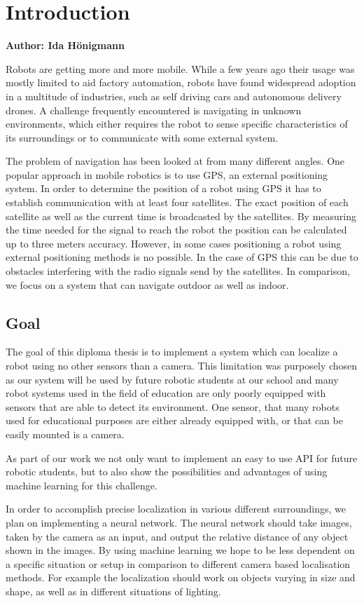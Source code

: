 \chapter{Introduction}

\textbf{Author: Ida Hönigmann}

\vspace{2mm}

Robots are getting more and more mobile. While a few years ago their usage was mostly limited to aid factory automation, robots have found widespread adoption in a multitude of industries, such as self driving cars and autonomous delivery drones.
A challenge frequently encountered is navigating in unknown environments, which either requires the robot to sense specific characteristics of its surroundings or to communicate with some external system.

The problem of navigation has been looked at from many different angles. One popular approach in mobile robotics is to use GPS, an external positioning system. In order to determine the position of a robot using GPS it has to establish communication with at least four satellites. The exact position of each satellite as well as the current time is broadcasted by the satellites. By measuring the time needed for the signal to reach the robot the position can be calculated up to three meters accuracy.
However, in some cases positioning a robot using external positioning methods is no possible. In the case of GPS this can be due to obstacles interfering with the radio signals send by the satellites.
In comparison, we focus on a system that can navigate outdoor as well as indoor. 

\section{Goal}
The goal of this diploma thesis is to implement a system which can localize a robot using no other sensors than a camera. This limitation was purposely chosen as our system will be used by future robotic students at our school and many robot systems used in the field of education are only poorly equipped with sensors that are able to detect its environment. One sensor, that many robots used for educational purposes are either already equipped with, or that can be easily mounted is a camera.

As part of our work we not only want to implement an easy to use API for future robotic students, but to also show the possibilities and advantages of using machine learning for this challenge.

In order to accomplish precise localization in various different surroundings, we plan on implementing a neural network. The neural network should take images, taken by the camera as an input, and output the relative distance of any object shown in the images. By using machine learning we hope to be less dependent on a specific situation or setup in comparison to different camera based localisation methods. For example the localization should work on objects varying in size and shape, as well as in different situations of lighting.

\filbreak
